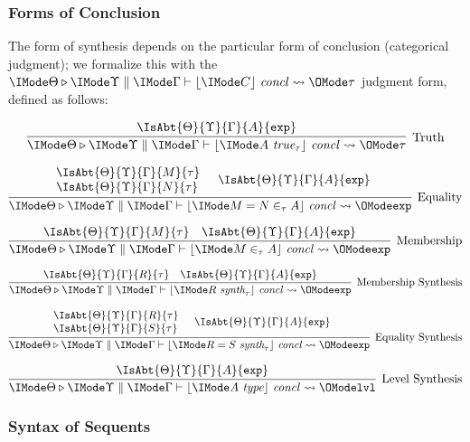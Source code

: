 \subsubsection{Forms of Conclusion}
The form of synthesis depends on the particular form of conclusion (categorical
judgment); we formalize this with the
$\IsConcl{\Theta}{\Upsilon}{\Gamma}{C}{\tau}$ judgment form, defined as
follows:

\[
  \infer[\text{Truth}]{
    \IsConcl{\Theta}{\Upsilon}{\Gamma}{A\ \textit{true}_\tau}{\tau}
  }{
    \IsAbt{\Theta}{\Upsilon}{\Gamma}{A}{\AbtSortExp}
  }
\]


\[
  \infer[\text{Equality}]{
    \IsConcl{\Theta}{\Upsilon}{\Gamma}{M = N \in_\tau A}{\AbtSortExp}
  }{
    \begin{array}{l}
      \IsAbt{\Theta}{\Upsilon}{\Gamma}{M}{\tau}\\
      \IsAbt{\Theta}{\Upsilon}{\Gamma}{N}{\tau}
    \end{array} &
    \IsAbt{\Theta}{\Upsilon}{\Gamma}{A}{\AbtSortExp}
  }
\]

\[
  \infer[\text{Membership}]{
    \IsConcl{\Theta}{\Upsilon}{\Gamma}{M \in_\tau A}{\AbtSortExp}
  }{
    \IsAbt{\Theta}{\Upsilon}{\Gamma}{M}{\tau} &
    \IsAbt{\Theta}{\Upsilon}{\Gamma}{A}{\AbtSortExp}
  }
\]

\[
  \infer[\text{Membership Synthesis}]{
    \IsConcl{\Theta}{\Upsilon}{\Gamma}{R\ \textit{synth}_\tau}{\AbtSortExp}
  }{
    \IsAbt{\Theta}{\Upsilon}{\Gamma}{R}{\tau} &
    \IsAbt{\Theta}{\Upsilon}{\Gamma}{A}{\AbtSortExp}
  }
\]

\[
  \infer[\text{Equality Synthesis}]{
    \IsConcl{\Theta}{\Upsilon}{\Gamma}{R = S\ \textit{synth}_\tau}{\AbtSortExp}
  }{
    \begin{array}{l}
      \IsAbt{\Theta}{\Upsilon}{\Gamma}{R}{\tau}\\
      \IsAbt{\Theta}{\Upsilon}{\Gamma}{S}{\tau}
    \end{array} &
    \IsAbt{\Theta}{\Upsilon}{\Gamma}{A}{\AbtSortExp}
  }
\]

\[
  \infer[\text{Level Synthesis}]{
    \IsConcl{\Theta}{\Upsilon}{\Gamma}{A\ \textit{type}}{\AbtSortLvl}
  }{
    \IsAbt{\Theta}{\Upsilon}{\Gamma}{A}{\AbtSortExp}
  }
\]

\subsubsection{Syntax of Sequents}

